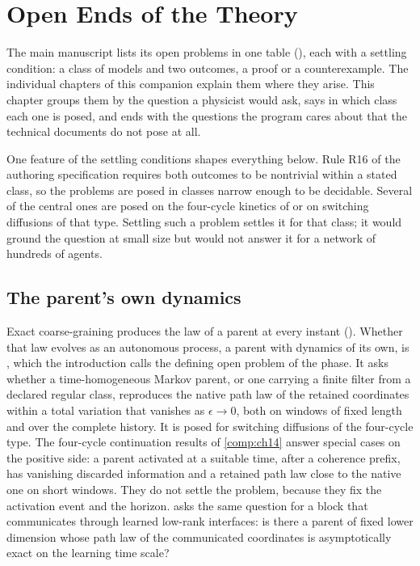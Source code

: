\chapter*{Open Ends of the Theory}
\label{comp:open-ends}

The main manuscript lists its open problems in one table (), each with a
settling condition: a class of models and two outcomes, a proof or a counterexample. The individual
chapters of this companion explain them where they arise. This chapter groups them by the question
a physicist would ask, says in which class each one is posed, and ends with the questions the program
cares about that the technical documents do not pose at all.

One feature of the settling conditions shapes everything below. Rule R16 of the authoring
specification requires both outcomes to be nontrivial within a stated class, so the problems are
posed in classes narrow enough to be decidable. Several of the central ones are posed on the
four-cycle kinetics of  or on switching diffusions of that
type. Settling such a problem settles it for that class; it would ground the question at small size
but would not answer it for a network of hundreds of agents.

\section*{The parent's own dynamics}

Exact coarse-graining produces the law of a parent at every instant
(). Whether that law evolves as an autonomous process, a parent
with dynamics of its own, is , which the introduction calls the
defining open problem of the phase. It asks whether a time-homogeneous Markov parent, or one carrying
a finite filter from a declared regular class, reproduces the native path law of the retained
coordinates within a total variation that vanishes as $\epsilon\to0$, both on windows of fixed length
and over the complete history. It is posed for switching diffusions of the four-cycle type. The
four-cycle continuation results of \cref{comp:ch14} answer special cases on the positive side: a
parent activated at a suitable time, after a coherence prefix, has vanishing discarded information and
a retained path law close to the native one on short windows. They do not settle the problem, because
they fix the activation event and the horizon.  asks the same
question for a block that communicates through learned low-rank interfaces: is there a parent of fixed
lower dimension whose path law of the communicated coordinates is asymptotically exact on the learning
time scale?

